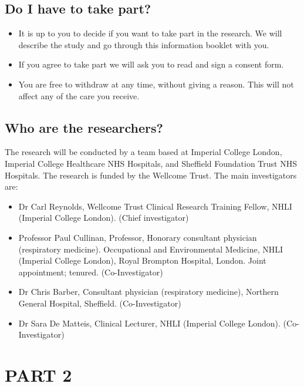 \documentclass[a4paper,10pt]{article}
\begin{document}
\subsection*{Do I have to take part?}
 \begin{itemize} 
 \item It is up to you to decide if you want to take part in the research. We will describe the study and go through this information booklet with you.
 \item If you agree to take part we will ask you to read and sign a consent form.
 \item You are free to withdraw at any time, without giving a reason. This will not affect any of the care you receive.
 \end{itemize} 

 
\subsection*{Who are the researchers?}
The research will be conducted by a team based at Imperial College London, Imperial College Healthcare NHS Hospitals, and Sheffield Foundation Trust NHS Hospitals. The research is funded by the Wellcome Trust. The main investigators are:
 \begin{itemize} 
    \item Dr Carl Reynolds, Wellcome Trust Clinical Research Training Fellow, NHLI (Imperial College London). (Chief investigator)
 \item Professor Paul Cullinan, Professor, Honorary consultant physician (respiratory medicine). Occupational and Environmental Medicine, NHLI (Imperial College London), Royal Brompton Hospital, London. Joint appointment; tenured. (Co-Investigator)
 \item Dr Chris Barber, Consultant physician (respiratory medicine), Northern General Hospital, Sheffield. (Co-Investigator)
 \item Dr Sara De Matteis, Clinical Lecturer, NHLI (Imperial College London). (Co-Investigator)
 \end{itemize} 

\section*{PART 2}
\end{document}
